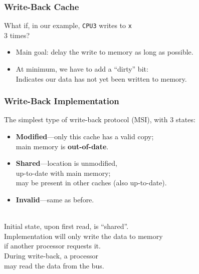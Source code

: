 \begin{frame}
  \frametitle{Write-Back Cache}
\Large

     What if, in our example, {\tt CPU3} writes to {\tt x} \\ 3 times?
    \begin{itemize}

    \item Main goal: delay the write to memory as long as possible.\\[1em]
    \item At minimum, we have to add a ``dirty'' bit:\\
     \quad Indicates our data has not yet been written to memory.
  \end{itemize}
  

\end{frame}

\begin{frame}
  \frametitle{Write-Back Implementation}
\large
  
     The simplest type of write-back protocol (MSI), with 3 states:
      \begin{itemize}
        \item {\bf Modified}---only this cache has a valid copy; \\
          \quad main memory is {\bf out-of-date}.
        \item {\bf Shared}---location is unmodified, \\
          \quad up-to-date with main
          memory; \\
          \quad may be present in other caches (also up-to-date).
        \item {\bf Invalid}---same as before.
      \end{itemize}~\\
      
     Initial state, upon first read, is ``shared''.\\[1em]

     Implementation will only write the data to memory \\if another
        processor requests it.\\[1em]

     During write-back, a processor \\
     may read the data from the bus.
  
\end{frame}

